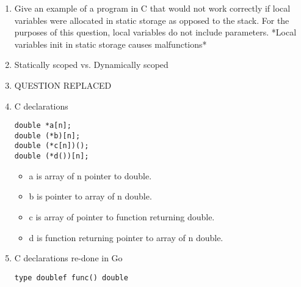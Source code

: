 \documentclass{article}
\begin{document}
\begin{enumerate}
\begin{enumerate}
\begin{verbatim}
    (function() {
      alert("Goodbye")
    }())
    \end{verbatim} \\
    This case is ambiguous because it seems as though \texttt{sayHello()} is a declaration, and the second function looks like it is being called. But, since there is no semicolon to break the first function definition, the parentheses around the second function act as a function call. It does not pass a value; instead, it calls a \texttt{void} function, which prints \texttt{"Goodbye"}. The script will print \texttt{"Goodbye"} first, and then \texttt{"Hello"}. Python does not run into this problem, because a function call has to be on the same line. The \texttt{NEWLINE} character will prevent anything that looks like a potential function call written on separate lines.
\end{enumerate}
\pagebreak
\item Give an example of a program in C that would not work correctly if local variables were allocated in static storage as opposed to the stack. For the purposes of this question, local variables do not include parameters. *Local variables init in static storage causes malfunctions*\\

\pagebreak
\item Statically scoped vs. Dynamically scoped
\pagebreak
\item QUESTION REPLACED 
\pagebreak
\item C declarations
\begin{verbatim}
double *a[n];  
double (*b)[n];
double (*c[n])();
double (*d())[n];
\end{verbatim}
\begin{itemize}
    \item a is array of n pointer to double.
    \item b is pointer to array of n double.
    \item c is array of pointer to function returning double.
    \item d is function returning pointer to array of n double.
\end{itemize}
\pagebreak
\item C declarations re-done in Go
\begin{verbatim}
type doublef func() double


\end{verbatim}
\end{enumerate}
\end{document}
